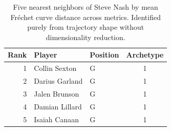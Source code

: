 \begin{table}[htbp]
  \centering\small
  \begin{tabular}{rllc}
    \toprule
    Rank & Player & Position & Archetype \\
    \midrule
    1 & Collin Sexton & G & 1 \\
    2 & Darius Garland & G & 1 \\
    3 & Jalen Brunson & G & 1 \\
    4 & Damian Lillard & G & 1 \\
    5 & Isaiah Canaan & G & 1 \\
    \bottomrule
  \end{tabular}
  \caption{Five nearest neighbors of Steve Nash by mean Fr\'{e}chet curve distance across metrics. Identified purely from trajectory shape without dimensionality reduction.}
  \label{tab:Steve_Nash_frechet_curve_neighbors}
\end{table}

